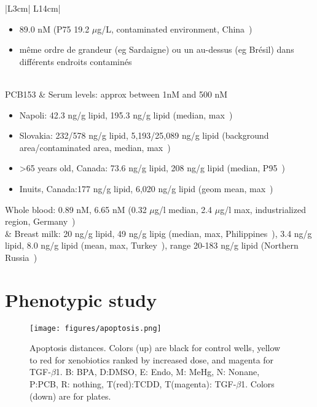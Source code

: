 \begin{center}
\begin{longtable}{|L{3cm}|%
L{14cm}|}
\begin{itemize}
\item 89.0 nM (P75 19.2 $ \mu$g/L, contaminated environment, China~\cite{pmid18675410})
\item m\^eme ordre de grandeur (eg Sardaigne) ou un au-dessus (eg Br\'esil) dans diff\'erents endroits contamin\'es~\cite{pmid18675410}
\end{itemize}
    \\
\hline
PCB153 &  Serum levels: approx between 1nM and 500 nM
\begin{itemize}
\item Napoli: 42.3 ng/g lipid, 195.3 ng/g lipid (median, max~\cite{pmid24112656})
\item Slovakia: 232/578 ng/g lipid, 5,193/25,089 ng/g lipid (background area/contaminated area, median, max~\cite{pmid24112656})
\item >65 years old, Canada: 73.6 ng/g lipid, 208 ng/g lipid (median, P95~\cite{pmid22001220})
\item Inuits, Canada:177 ng/g lipid, 6,020 ng/g lipid (geom mean, max~\cite{pmid20435334})
\end{itemize} Whole blood: 0.89 nM, 6.65 nM (0.32 $\mu$g/l median, 2.4 $\mu$g/l max, industrialized region, Germany~\cite{pmid17217986})\\ &
 Breast milk: 20 ng/g lipid, 49 ng/g lipig (median, max, Philippines~\cite{pmid23178840}), 3.4 ng/g lipid, 8.0 ng/g lipid (mean, max, Turkey~\cite{pmid22280929}), range 20-183 ng/g lipid (Northern Russia~\cite{pmid18063018})%
\\
\label{table_xb2}
\end{longtable}
\end{center}
\clearpage
\section{Phenotypic study}
\label{phenotypic_annex}
\begin{figure}
\caption{Apoptosis distances. Colors (up) are black for control wells, yellow to red for xenobiotics ranked by increased dose, and magenta for TGF-$\beta$1. B: BPA, D:DMSO, E: Endo, M: MeHg, N: Nonane, P:PCB, R: nothing, T(red):TCDD, T(magenta): TGF-$\beta$1. Colors (down) are for plates.}
\label{apoptosis}
\texttt{[image: figures/apoptosis.png]}
\end{figure}



